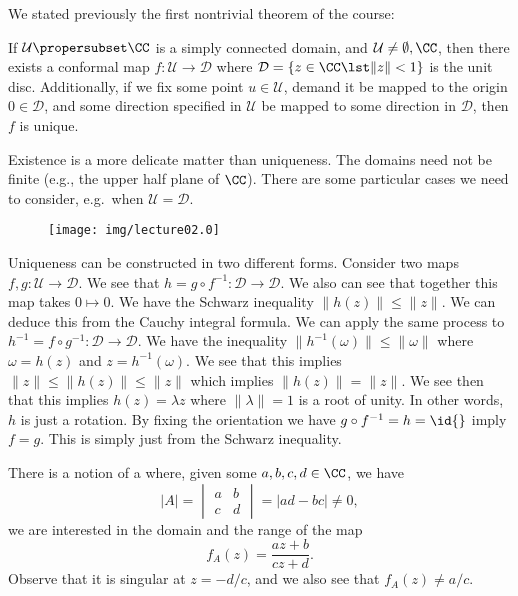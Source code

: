 We stated previously the first nontrivial theorem of the course:
\begin{riemMap}
If $\mathcal{U}\propersubset\CC$ is a simply connected domain,
and $\mathcal{U}\not=\emptyset,\CC$, then there exists a
conformal map $f\colon\mathcal{U}\to\mathcal{D}$ where
$\mathcal{D}=\{z\in\CC\lst\|z\|<1\}$ is the unit
disc. Additionally, if we fix some point $u\in\mathcal{U}$,
demand it be mapped to the origin $0\in\mathcal{D}$, and some
direction specified in $\mathcal{U}$ be mapped to some direction
in $\mathcal{D}$, then $f$ is unique.
\end{riemMap}

Existence is a more delicate matter than uniqueness. The domains
need not be finite (e.g., the upper half plane of $\CC$). There
are some particular cases we need to consider, e.g.\ when
$\mathcal{U}=\mathcal{D}$. 

\begin{wrapfigure}{r}{2.35in}
\vspace{-30pt}
\begin{center}
\texttt{[image: img/lecture02.0]}
\end{center}
\vspace{-20pt}
\end{wrapfigure}
Uniqueness can be constructed in two different forms. Consider
two maps $f,g\colon\mathcal{U}\to\mathcal{D}$. We see that
$h=g\circ f^{-1}\colon\mathcal{D}\to\mathcal{D}$. We also can see
that together this map takes $0\mapsto0$. We have the Schwarz
inequality $\|h(z)\|\leq\|z\|$. We can deduce this from the
Cauchy integral formula. We can apply the same process to
$h^{-1}=f\circ g^{-1}\colon\mathcal{D}\to\mathcal{D}$. We have
the inequality $\|h^{-1}(\omega)\|\leq\|\omega\|$ where
$\omega=h(z)$ and $z=h^{-1}(\omega)$. We see that this implies
$\|z\|\leq\|h(z)\|\leq\|z\|$ which implies $\|h(z)\|=\|z\|$. We
see then that this implies $h(z)=\lambda z$ where $\|\lambda\|=1$
is a root of unity. In other words, $h$ is just a rotation. By
fixing the orientation we have $g\circ f^{-1}=h=\id{}$ imply
$f=g$. This is simply just from the Schwarz inequality.

There is a notion of a  where,
given some $a,b,c,d\in\CC$, we have
\begin{equation}
|A|=\begin{vmatrix}
a & b\\ c&d
\end{vmatrix}
=|ad-bc|\not=0,
\end{equation}
we are interested in the domain and the range of the map
\begin{equation}
f_{A}(z)=\frac{az+b}{cz+d}.
\end{equation}
Observe that it is singular at $z=-d/c$, and we also see that
$f_{A}(z)\not=a/c$. 

